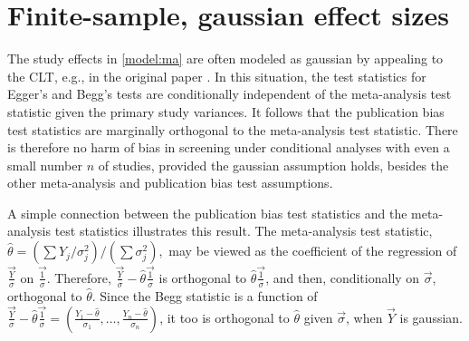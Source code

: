 \documentclass[12pt]{article}
\newcommand{\y}{Y}
\begin{document}
    \section{Finite-sample, gaussian effect sizes}
    \label{sec:finite}

The study effects in \eqref{model:ma} are often modeled as gaussian by
appealing to the CLT, e.g., in the original paper \citet{begg:94a}. In this
situation, the test statistics for Egger's and Begg's tests are
conditionally independent of the meta-analysis test statistic given
the primary study variances. It follows that the publication bias test
statistics are marginally orthogonal to the meta-analysis test
statistic. There is therefore no harm of bias in screening under conditional
analyses with even a small number $n$ of studies, provided the gaussian assumption holds, besides the other meta-analysis and publication bias test assumptions.%


A simple connection between the publication bias test statistics and
the meta-analysis test statistics illustrates this result. The
meta-analysis test statistic,
$\hat\theta=(\sum \y_j/\sigma_j^2)/(\sum\sigma_j^2),$ may be viewed as
the coefficient of the regression of $\vec{\frac{\y}{\sigma}}$ on
$\vec{\frac{1}{\sigma}}$. Therefore,
$\vec{\frac{\y}{\sigma}}-\hat\theta\vec{\frac{1}{\sigma}}$ is
orthogonal to $\hat\theta\vec{\frac{1}{\sigma}}$, and then,
conditionally on $\vec\sigma$, orthogonal to $\hat\theta$.  Since the
Begg statistic is a function of
$\vec{\frac{\y}{\sigma}}-\hat\theta\vec{\frac{1}{\sigma}}=(\frac{\y_1-\hat\theta}{\sigma_1},\ldots,\frac{\y_n-\hat\theta}{\sigma_n})$,
it too is orthogonal to $\hat\theta$ given $\vec\sigma$, when $\vec\y$ is gaussian.
\end{document}

